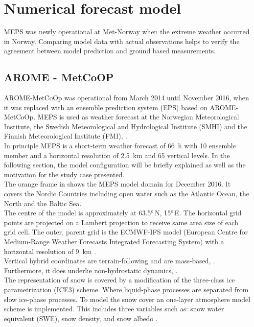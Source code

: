\chapter{Numerical forecast model}
MEPS was newly operational at Met-Norway when the extreme weather occurred in Norway. Comparing model data with actual observations helps to verify the agreement between model prediction and ground based measurements. 

\section{AROME - MetCoOP}
\label{sec:MEPS}
AROME-MetCoOp was operational from March 2014 until November 2016, when it was replaced with an ensemble prediction system (EPS) based on AROME-MetCoOp.
MEPS is used as weather forecast at the Norwegian Meteorological Institute, the Swedish Meteorological and Hydrological Institute (SMHI) and the Finnish Meteorological Institute (FMI), \citep{muller_arome-metcoop:_2017, koltzow_metcoop_2017}. 
\\
In principle MEPS is a short-term weather forecast of \SI{66}{\hour} with 10 ensemble member and a horizontal resolution of \SI{2.5}{\km} and 65 vertical levels. In the following section, the model configuration will be briefly explained as well as the motivation for the study case presented.
\\
The orange frame in  shows the MEPS model domain for December 2016. It covers the Nordic Countries including open water such as the Atlantic Ocean, the North and the Baltic Sea.  
\\
The centre of the model is approximately at \ang{63.5}\,N, \ang{15}\,E. 
The horizontal grid points are projected on a Lambert projection to receive same area size of each grid cell. 
The outer, parent grid is the ECMWF-IFS model (European Centre for Medium-Range Weather Forecasts Integrated Forecasting System) with a horizontal resolution of \SI{9}{\km} \citep{homleid_verification_2016}. 
\\
Vertical hybrid coordinates are terrain-following and are mass-based, \citep{muller_arome-metcoop:_2017}. Furthermore, it does underlie non-hydrostatic dynamics, \citep{wiki_description_2017}.
\\
The representation of snow is covered by a modification of the three-class ice parametrization (ICE3) scheme. Where liquid-phase processes are separated from slow ice-phase processes. To model the snow cover an one-layer atmosphere model scheme is implemented. This includes three variables such as: snow water equivalent (SWE), snow density, and snow albedo \citep{muller_arome-metcoop:_2017}.
